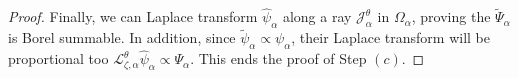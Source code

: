 \documentclass{article}
\newcommand{\series}[1]{\tilde{#1}}
\newcommand{\laplace}{\mathcal{L}}
\newcommand{\borel}{\mathcal{B}}
\theoremstyle{definition}
\theoremstyle{plain}
\begin{document}
\begin{proof}
Finally, we can Laplace transform $\hat{\psi}_\alpha$ along a ray $\mathcal{J}_{\alpha}^\theta$ in $\Omega_\alpha$, proving the $\tilde{\Psi}_\alpha$ is Borel summable. In addition, since $\tilde{\psi}_\alpha\propto\psi_\alpha$, their Laplace transform will be proportional too $\laplace_{\zeta,\alpha}^\theta\hat{\psi}_\alpha\propto \Psi_\alpha$. This ends the proof of Step $(c)$. 
 










%


\end{proof}
\end{document}
